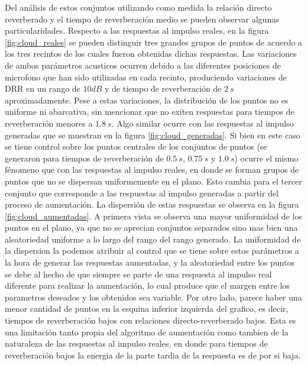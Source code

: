 Del análisis de estos conjuntos utilizando como medida la relación directo reverberado  y el tiempo de reverberación medio se pueden observar algunas particularidades. Respecto a las respuestas al impulso reales, en la figura \ref{fig:cloud_reales} se pueden distinguir tres grandes grupos de puntos de acuerdo a los tres recintos de los cuales fueron obtenidas dichas respuestas. Las variaciones de ambos parámetros acusticos ocurren debido a las diferentes posiciones de microfono que han sido utilizadas en cada recinto, produciendo variaciones de DRR en un rango de $10 dB$ y de tiempo de reverberación de $2 \ s$ aproximadamente. Pese a estas variaciones, la distribución de los puntos no es uniforme ni abarcativa, sin mencionar que no exiten respuestas para tiempos de reverberación menores a $1.8 \ s$. Algo similar ocurre con las respuestas al impulso generadas que se muestran en la figura \ref{fig:cloud_generadas}. Si bien en este caso se tiene control sobre los puntos centrales de los conjuntos de puntos (se generaron para tiempos de reverberación de $0.5 \ s$, $0.75 \ s$ y $1.0 \ s$) ocurre el mismo fénomeno que con las respuestas al impulso reales, en donde se forman grupos de puntos que no se dispersan uniformemente en el plano. Esto cambia para el tercer conjunto que corresponde a las respuestas al impulso generadas a partir del proceso de aumentación. La dispersión de estas respuestas se observa en la figura \ref{fig:cloud_aumentadas}. A primera vista se observa una mayor uniformidad de los puntos en el plano, ya que no se aprecian conjuntos separados sino mas bien una aleatoriedad uniforme a lo largo del rango del rango generado. La uniformidad de la dispersion la podemos atribuir al control que se tiene sobre estos parámetros a la hora de generar las respuestas aumentadas, y la aleatoriedad entre los puntos se debe al hecho de que siempre se parte de una respuesta al impulso real diferente para realizar la aumentación, lo cual produce que el margen entre los parametros deseados y los obtenidos sea variable. Por otro lado, parece haber una menor cantidad de puntos en la esquina inferior izquierda del grafico, es decir, tiempos de reverberación bajos con relaciones directo-reverberado bajos. Esta es una limitación tanto propia del algoritmo de aumentación como tambien de la naturaleza de las respuestas al impulso reales, en donde para tiempos de reverberación bajos la energia de la parte tardia de la respuesta es de por si baja. 





